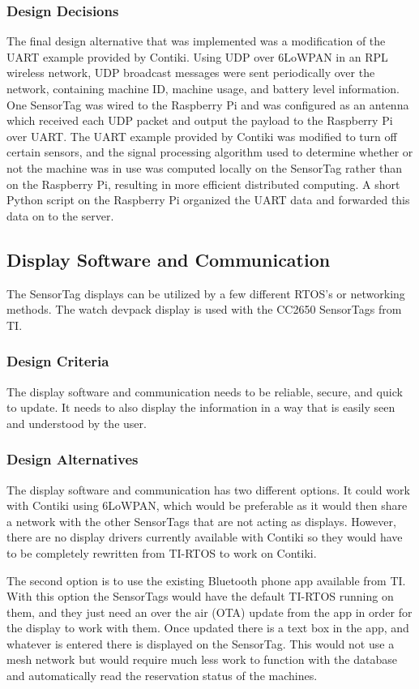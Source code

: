 \documentclass[PPFS.tex]{template/subfiles}
\begin{document}
\subsubsection{Design Decisions}
The final design alternative that was implemented was a modification of the UART example provided by Contiki. Using UDP over 6LoWPAN in an RPL wireless network, UDP broadcast messages were sent periodically over the network, containing machine ID, machine usage, and battery level information. One SensorTag was wired to the Raspberry Pi and was configured as an antenna which received each UDP packet and output the payload to the Raspberry Pi over UART. The UART example provided by Contiki was modified to turn off certain sensors, and the signal processing algorithm used to determine whether or not the machine was in use was computed locally on the SensorTag rather than on the Raspberry Pi, resulting in more efficient distributed computing. A short Python script on the Raspberry Pi organized the UART data and forwarded this data on to the server.

\subsection{Display Software and Communication}
The SensorTag displays can be utilized by a few different RTOS's or networking methods. The watch devpack display is used with the CC2650 SensorTags from TI.

\subsubsection{Design Criteria}
The display software and communication needs to be reliable, secure, and quick to update. It needs to also display the information in a way that is easily seen and understood by the user. 

\subsubsection{Design Alternatives}
The display software and communication has two different options. It could work with Contiki using 6LoWPAN, which would be preferable as it would then share a network with the other SensorTags that are not acting as displays. However, there are no display drivers currently available with Contiki so they would have to be completely rewritten from TI-RTOS to work on Contiki.

The second option is to use the existing Bluetooth phone app available from TI. With this option the SensorTags would have the default TI-RTOS running on them, and they just need an over the air (OTA) update from the app in order for the display to work with them. Once updated there is a text box in the app, and whatever is entered there is displayed on the SensorTag. This would not use a mesh network but would require much less work to function with the database and automatically read the reservation status of the machines.
\end{document}
